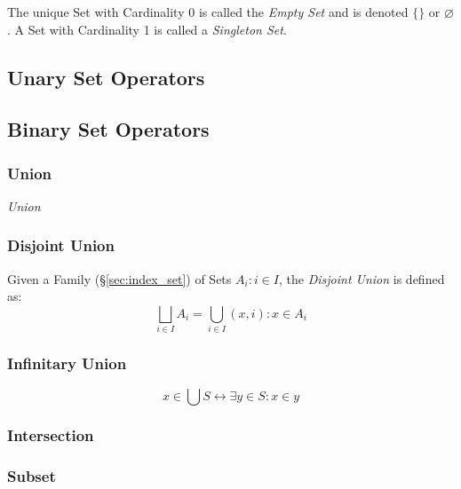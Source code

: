 The unique Set with Cardinality 0 is called the \emph{Empty Set} and
is denoted $\{\}$ or $\varnothing$. A Set with Cardinality 1 is called a
\emph{Singleton Set}.



\subsection{Unary Set Operators}

\subsection{Binary Set Operators}

\subsubsection{Union}

\emph{Union}

\subsubsection{Disjoint Union}\label{sec:disjoint_union}

Given a Family (\S\ref{sec:index_set}) of Sets ${A_i : i \in I}$,
the \emph{Disjoint Union} is defined as:
\[
    \bigsqcup_{i \in I} A_i = \bigcup_{i \in I} {(x,i) : x \in A_i}
\]



\subsubsection{Infinitary Union}

\[
    x \in \bigcup S \leftrightarrow \exists y \in S : x \in y
\]



\subsubsection{Intersection}



\subsubsection{Subset}

